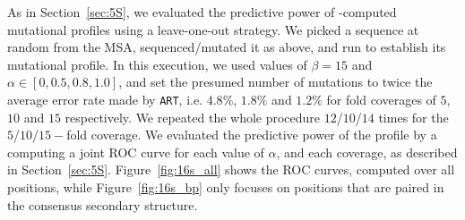 As in Section~\ref{sec:5S}, we evaluated the predictive power of \RNApyro-computed mutational profiles using a leave-one-out strategy. We picked a sequence at random from the MSA, sequenced/mutated it as above, and run \RNApyro to establish its mutational profile. In this execution, we used values of $\beta=15$ and $\alpha\in [0, 0.5, 0.8, 1.0]$, and set the presumed number of mutations to twice the average error rate made by {\tt ART}, i.e. $4.8\%$, $1.8\%$ and $1.2\%$ for fold coverages of $5$, $10$ and $15$ respectively.
We repeated the whole procedure $12$/$10$/$14$ times for the $5$/$10$/$15-$fold coverage. 
We evaluated the predictive power of the profile by a computing a joint ROC curve for each value of $\alpha$, and each coverage, as described in Section~\ref{sec:5S}. Figure~\ref{fig:16s_all} shows the ROC curves, computed over all positions, while Figure~\ref{fig:16s_bp} only focuses on positions that are paired in the consensus secondary structure.



 



